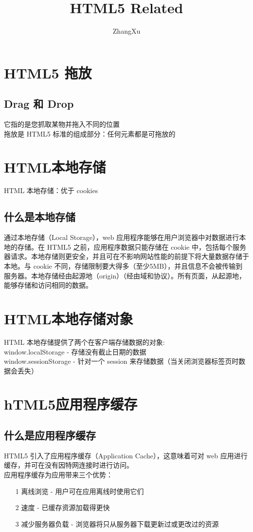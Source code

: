 \documentclass[10pt,UTF8]{ctexart}
\title{HTML5 Related}
\author{ZhangXu}
\begin{document}
\maketitle
{}
\section{HTML5 拖放}
\subsection{Drag 和 Drop}
它指的是您抓取某物并拖入不同的位置\\
拖放是 HTML5 标准的组成部分：任何元素都是可拖放的

\section{HTML本地存储}
HTML 本地存储：优于 cookies
\subsection{什么是本地存储}
通过本地存储（Local Storage），web 应用程序能够在用户浏览器中对数据进行本地的存储。在 HTML5 之前，应用程序数据只能存储在 cookie 中，包括每个服务器请求。本地存储则更安全，并且可在不影响网站性能的前提下将大量数据存储于本地。与 cookie 不同，存储限制要大得多（至少5MB），并且信息不会被传输到服务器。本地存储经由起源地（origin）（经由域和协议）。所有页面，从起源地，能够存储和访问相同的数据。
\section{HTML本地存储对象}
HTML 本地存储提供了两个在客户端存储数据的对象:\\
window.localStorage - 存储没有截止日期的数据\\
window.sessionStorage - 针对一个 session 来存储数据（当关闭浏览器标签页时数据会丢失）

\section{hTML5应用程序缓存}
\subsection{什么是应用程序缓存}
HTML5 引入了应用程序缓存（Application Cache），这意味着可对 web 应用进行缓存，并可在没有因特网连接时进行访问。\\
应用程序缓存为应用带来三个优势：
\begin{itemize}
\item[1] 离线浏览 - 用户可在应用离线时使用它们
\item[2] 速度 - 已缓存资源加载得更快
\item[3] 减少服务器负载 - 浏览器将只从服务器下载更新过或更改过的资源
\end{itemize}
\end{document}
